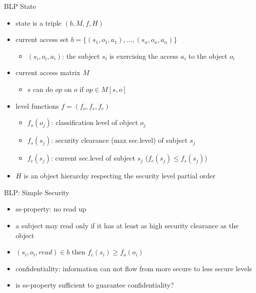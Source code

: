 \documentclass{beamer}
\begin{document}
\begin{frame}{BLP State}
  \begin{itemize}
  \item state is a triple $(b,M,f, H)$
  \item current access set $b = \{(s_1,o_1,a_1),\dots,(s_n,o_n,a_n)\}$
    \begin{itemize}
    \item $(s_i,o_i,a_i)$: the subject $s_i$ is exercising the access
      $a_i$ to the object $o_i$
    \end{itemize}
  \item current access matrix $M$
    \begin{itemize}
    \item $s$ can do $op$ on $o$ if $op \in M[s,o]$
    \end{itemize}
  \item level functions $f=(f_o, f_s, f_c)$
    \begin{itemize}
      \item $f_o(o_j)$: classification level of object $o_j$
      \item $f_s(s_j)$: security clearance (max sec.level) of subject $s_j$
      \item $f_c(s_j)$: current sec.level of subject $s_j$
        ($f_c(s_j) \leq f_s(s_j)$)
    \end{itemize}
    \item $H$ is an object hierarchy respecting the
      security level partial order
  \end{itemize}
\end{frame}

\begin{frame}{BLP: Simple Security}
  \begin{itemize}
  \item ss-property: no read up
  \item a subject may read only if it has at least as high security
    clearance as the object
  \item $(s_i, o_i, read) \in b$ then
    $f_c(s_i) \geq f_o(o_i)$
  \item<2-> \alert{confidentiality}: information can not flow from more secure to 
        less secure levels
  \item<3-> is ss-property sufficient to guarantee confidentiality?
  \end{itemize}
\end{frame}
\end{document}
